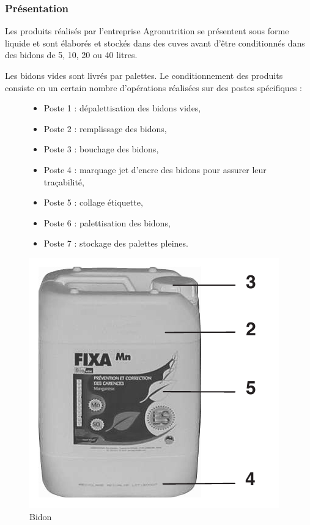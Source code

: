 \subsubsection{Présentation}

Les produits réalisés par l'entreprise Agronutrition se présentent sous forme liquide et sont élaborés et stockés dans des cuves avant d'être conditionnés dans des bidons de 5, 10, 20 ou 40 litres.

Les bidons vides sont livrés par palettes. Le conditionnement des produits consiste en un certain nombre d'opérations réalisées sur des postes spécifiques :

\begin{figure}[!h]
 \begin{minipage}{0.55\linewidth}
\begin{itemize}
 \item Poste 1 : dépalettisation des bidons vides,
 \item Poste 2 : remplissage des bidons,
 \item Poste 3 : bouchage des bidons,
 \item Poste 4 : marquage jet d'encre des bidons pour assurer leur traçabilité,
 \item Poste 5 : collage étiquette,
 \item Poste 6 : palettisation des bidons,
 \item Poste 7 : stockage des palettes pleines.
\end{itemize}
 \end{minipage}
\hfill
 \begin{minipage}{0.40\linewidth}
  \centering\includegraphics[width=0.7\linewidth]{img/bidon.png}
  \caption{Bidon}
  \label{img:image101}
 \end{minipage}
\end{figure}

